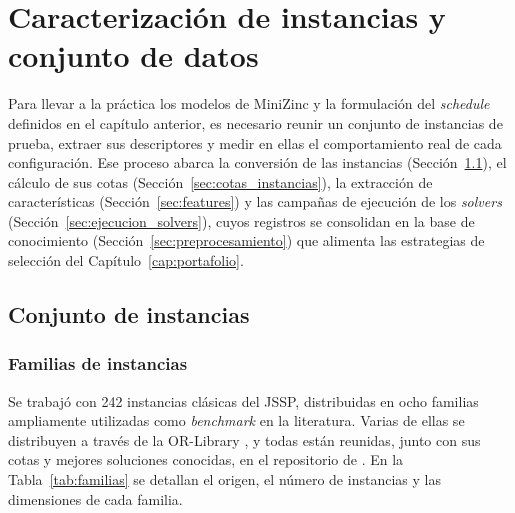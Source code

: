 \chapter{Caracterización de instancias y conjunto de datos}
\label{cap:caracterizacion}

Para llevar a la práctica los modelos de MiniZinc y la formulación del
\textit{schedule} definidos en el capítulo anterior, es necesario
reunir un conjunto de instancias de prueba, extraer sus descriptores y medir
en ellas el comportamiento real de cada configuración. Ese proceso abarca la
conversión de las instancias (Sección~\ref{sec:instancias}), el cálculo de sus
cotas (Sección~\ref{sec:cotas_instancias}), la extracción de características
(Sección~\ref{sec:features}) y las campañas de ejecución de los
\textit{solvers} (Sección~\ref{sec:ejecucion_solvers}), cuyos registros se
consolidan en la base de conocimiento (Sección~\ref{sec:preprocesamiento}) que
alimenta las estrategias de selección del Capítulo~\ref{cap:portafolio}.

\section{Conjunto de instancias}
\label{sec:instancias}

\subsection{Familias de instancias}

Se trabajó con 242 instancias clásicas del JSSP, distribuidas en ocho familias
ampliamente utilizadas como \textit{benchmark} en la literatura. Varias de ellas
se distribuyen a través de la OR-Library \citep{beasley1990}, y todas están
reunidas, junto con sus cotas y mejores soluciones conocidas, en el repositorio
de \citet{weise2019jssp}. En la Tabla~\ref{tab:familias} se detallan el origen,
el número de instancias y las dimensiones de cada familia.

